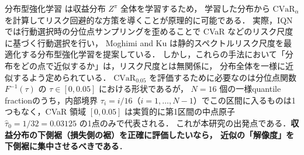 \documentclass[a4paper,10pt]{jsarticle}
\theoremstyle{definition}
\newcommand{\CVaR}{\mathrm{CVaR}}
\newcommand{\Finv}{F^{-1}}
\begin{document}
分布型強化学習 \cite{bellemare2017c51,dabney2018qrdqn,dabney2018iqn,yang2019fqf} は収益分布 $Z^\pi$ 全体を学習するため，
学習した分布から $\CVaR_\alpha$ を計算してリスク回避的な方策を導くことが原理的に可能である．
実際，IQN \cite{dabney2018iqn} では行動選択時の分位点サンプリングを歪めることで CVaR などのリスク尺度に基づく行動選択を行い，
Moghimi and Ku \cite{moghimi2025beyond} は静的スペクトルリスク尺度を最適化する分布型強化学習を提案している．
しかし，これらの手法において「分布をどの点で近似するか」は，リスク尺度とは無関係に，
分布全体を一様に近似するよう定められている．
$\CVaR_{0.05}$ を評価するために必要なのは分位点関数 $\Finv(\tau)$ の $\tau\in[0,0.05]$ における形状であるが，
$N=16$ 個の一様quantile fractionのうち，内部境界 $\tau_i=i/16$（$i=1,\dots,N-1$）でこの区間に入るものは1つもなく，CVaR 領域 $[0, 0.05]$ は実質的に第1区間の中点原子 $\hat\tau_0=1/32=0.03125$ の1点のみで代表される．
これが本研究の出発点である．\textbf{収益分布の下側裾（損失側の裾）を正確に評価したいなら，
近似の「解像度」を下側裾に集中させるべきである}．
\end{document}
